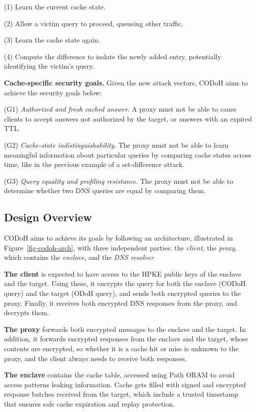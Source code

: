 \documentclass[a4paper]{article}
\begin{document}
(1) Learn the current cache state.

(2) Allow a victim query to proceed, queueing other traffic.

(3) Learn the cache state again.

(4) Compute the difference to isolate the newly added entry, potentially identifying the victim's query.

\textbf{Cache-specific security goals.} Given the new attack vectors,  CODoH aims to achieve the security goals below:

(G1) \textit{Authorized and fresh cached answer}. A proxy must not be able to cause clients to accept answers not authorized by the target, or answers with an expired TTL.

(G2) \textit{Cache-state indistinguishability}. The proxy must not be able to learn meaningful information about particular queries by comparing cache states across time, like in the previous example of a set-difference attack.

(G3) \textit{Query equality and profiling resistance}. The proxy must not be able to determine whether two DNS queries are equal by comparing them.

\subsection{Design Overview}
\label{sec:designoverview}

CODoH \citep{niroula2026codoh} aims to achieve its goals by following an architecture, illustrated in Figure~\ref{fig-codoh-arch}, with three independent parties: the \textit{client}, the \textit{proxy}, which contains the \textit{enclave}, and the \textit{DNS resolver}

\textbf{The client} is expected to have access to the HPKE public keys of the enclave and the target. Using these, it encrypts the query for both the enclave (CODoH query) and the target (ODoH query), and sends both encrypted queries to the proxy. Finally, it receives both encrypted DNS responses from the proxy, and decrypts them.

\textbf{The proxy} forwards both encrypted messages to the enclave and the target. In addition, it forwards encrypted responses from the enclave and the target, whose contents are encrypted, so whether it is a cache hit or miss is unknown to the proxy, and the client always needs to receive both responses.

\textbf{The enclave} contains the cache table, accessed using Path ORAM to avoid access patterns leaking information. Cache gets filled with signed and encrypted response batches received from the target, which include a trusted timestamp that ensures safe cache expiration and replay protection.
\end{document}
